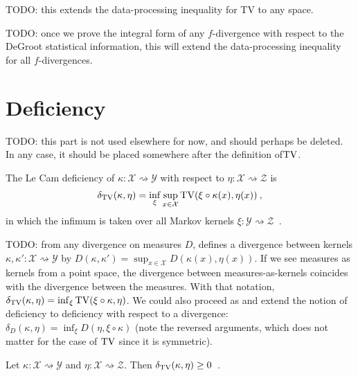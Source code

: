 TODO: this extends the data-processing inequality for TV to any space.

TODO: once we prove the integral form of any $f$-divergence with respect to the DeGroot statistical information, this will extend the data-processing inequality for all $f$-divergences. 

\section{Deficiency}

TODO: this part is not used elsewhere for now, and should perhaps be deleted.
In any case, it should be placed somewhere after the definition of$\operatorname{TV}$.

\begin{definition}
  \label{def:deficiency}
  The Le Cam deficiency of $\kappa : \mathcal X \rightsquigarrow \mathcal Y$ with respect to $\eta : \mathcal X \rightsquigarrow \mathcal Z$ is
  \begin{align*}
  \delta_{\operatorname{TV}}(\kappa, \eta) = \inf_{\xi} \sup_{x \in \mathcal X} \operatorname{TV}(\xi \circ \kappa (x), \eta(x)) \: ,
  \end{align*}
  in which the infimum is taken over all Markov kernels $\xi : \mathcal Y \rightsquigarrow \mathcal Z$~.
\end{definition}

TODO: from any divergence on measures $D$, \cite{perrone2023markov} defines a divergence between kernels $\kappa, \kappa' : \mathcal X \rightsquigarrow \mathcal Y$ by $D(\kappa, \kappa') = \sup_{x \in \mathcal X} D(\kappa(x), \eta(x))$.
If we see measures as kernels from a point space, the divergence between measures-as-kernels coincides with the divergence between the measures.
With that notation, $\delta_{\operatorname{TV}}(\kappa, \eta) = \inf_{\xi} \operatorname{TV}(\xi \circ \kappa, \eta)$.
We could also proceed as \cite{raginsky2011shannon} and extend the notion of deficiency to deficiency with respect to a divergence: $\delta_D(\kappa, \eta) = \inf_{\xi} D(\eta, \xi\circ\kappa)$ (note the reversed arguments, which does not matter for the case of $\operatorname{TV}$ since it is symmetric).

\begin{lemma}
  \label{lem:deficiency_nonneg}
  Let $\kappa: \mathcal X \rightsquigarrow \mathcal Y$ and $\eta : \mathcal X \rightsquigarrow \mathcal Z$. Then $\delta_{\operatorname{TV}}(\kappa, \eta) \ge 0$~.
\end{lemma}

